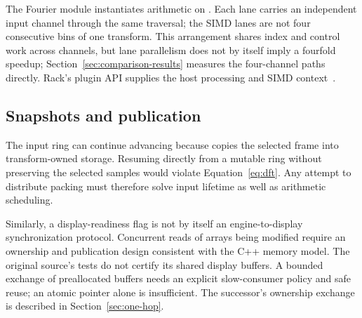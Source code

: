 The Fourier module instantiates arithmetic on . Each lane
carries an independent input channel through the same traversal; the SIMD
lanes are not four consecutive bins of one transform. This arrangement
shares index and control work across channels, but lane parallelism does not
by itself imply a fourfold speedup; Section~\ref{sec:comparison-results}
measures the four-channel paths directly. Rack's plugin API supplies the host
processing and SIMD context~\cite{rack}.

\subsection{Snapshots and publication}
The input ring can continue advancing because  copies the
selected frame into transform-owned storage. Resuming directly from a mutable
ring without preserving the selected samples would violate
Equation~\eqref{eq:dft}. Any attempt to distribute packing must therefore solve
input lifetime as well as arithmetic scheduling.

Similarly, a display-readiness flag is not by itself an engine-to-display
synchronization protocol. Concurrent reads of arrays being modified require an
ownership and publication design consistent with the C++ memory model. The
original source's tests do not certify its shared display buffers.
A bounded exchange of preallocated buffers needs an explicit slow-consumer
policy and safe reuse; an atomic pointer alone is insufficient. The successor's
ownership exchange is described in Section~\ref{sec:one-hop}.

